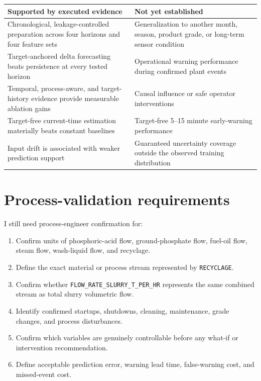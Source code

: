 \documentclass[10pt,a4paper]{article}
\begin{document}
\begin{tabularx}{\textwidth}{Y Y}
\toprule
\textbf{Supported by executed evidence} & \textbf{Not yet established} \\
\midrule
Chronological, leakage-controlled preparation across four horizons and four feature sets & Generalization to another month, season, product grade, or long-term sensor condition \\
Target-anchored delta forecasting beats persistence at every tested horizon & Operational warning performance during confirmed plant events \\
Temporal, process-aware, and target-history evidence provide measurable ablation gains & Causal influence or safe operator interventions \\
Target-free current-time estimation materially beats constant baselines & Target-free 5--15 minute early-warning performance \\
Input drift is associated with weaker prediction support & Guaranteed uncertainty coverage outside the observed training distribution \\
\bottomrule
\end{tabularx}

\section{Process-validation requirements}

I still need process-engineer confirmation for:
\begin{enumerate}
  \item Confirm units of phosphoric-acid flow, ground-phosphate flow, fuel-oil flow, steam flow, wash-liquid flow, and recyclage.
  \item Define the exact material or process stream represented by \texttt{RECYCLAGE}.
  \item Confirm whether \texttt{FLOW\_RATE\_SLURRY\_T\_PER\_HR} represents the same combined stream as total slurry volumetric flow.
  \item Identify confirmed startups, shutdowns, cleaning, maintenance, grade changes, and process disturbances.
  \item Confirm which variables are genuinely controllable before any what-if or intervention recommendation.
  \item Define acceptable prediction error, warning lead time, false-warning cost, and missed-event cost.
\end{enumerate}
\end{document}
